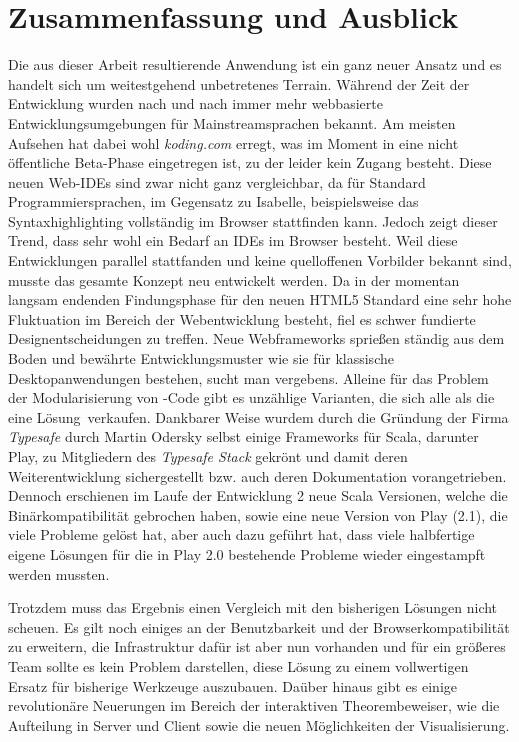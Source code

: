 \chapter{Zusammenfassung und Ausblick}

Die aus dieser Arbeit resultierende Anwendung ist ein ganz neuer Ansatz und es handelt sich um
weitestgehend unbetretenes Terrain. Während der Zeit der Entwicklung wurden nach und nach immer mehr
webbasierte Entwicklungsumgebungen für Mainstreamsprachen bekannt. Am meisten Aufsehen hat dabei
wohl \textit{koding.com} erregt, was im Moment in eine nicht öffentliche Beta-Phase eingetregen ist,
zu der leider kein Zugang besteht. Diese neuen Web-IDEs sind zwar nicht ganz vergleichbar, da für
Standard Programmiersprachen, im Gegensatz zu Isabelle, beispielsweise das Syntaxhighlighting
vollständig im Browser stattfinden kann. Jedoch zeigt dieser Trend, dass sehr wohl ein Bedarf an
IDEs im Browser besteht. Weil diese Entwicklungen parallel stattfanden und keine quelloffenen
Vorbilder bekannt sind, musste das gesamte Konzept neu entwickelt werden. Da in der momentan
langsam endenden Findungsphase für den neuen HTML5 Standard eine sehr hohe Fluktuation im Bereich
der Webentwicklung besteht, fiel es schwer fundierte Designentscheidungen zu treffen. Neue
Webframeworks sprießen ständig aus dem Boden und bewährte Entwicklungsmuster wie sie für klassische
Desktopanwendungen bestehen, sucht man vergebens. Alleine für das Problem der Modularisierung von
-Code gibt es unzählige Varianten, die sich alle als \glqq die eine Lösung\grqq\ verkaufen.
Dankbarer Weise wurdem durch die Gründung der Firma \textit{Typesafe} durch Martin Odersky selbst
einige Frameworks für Scala, darunter Play, zu Mitgliedern des \textit{Typesafe Stack} gekrönt und
damit deren Weiterentwicklung sichergestellt bzw. auch deren Dokumentation vorangetrieben. Dennoch
erschienen im Laufe der Entwicklung 2 neue Scala Versionen, welche die Binärkompatibilität gebrochen
haben, sowie eine neue Version von Play (2.1), die viele Probleme gelöst hat, aber auch dazu geführt
hat, dass viele halbfertige eigene Lösungen für die in Play 2.0 bestehende Probleme wieder
eingestampft werden mussten.

Trotzdem muss das Ergebnis einen Vergleich mit den bisherigen Lösungen nicht scheuen. Es gilt noch
einiges an der Benutzbarkeit und der Browserkompatibilität zu erweitern, die Infrastruktur dafür ist
aber nun vorhanden und für ein größeres Team sollte es kein Problem darstellen, diese Lösung zu
einem vollwertigen Ersatz für bisherige Werkzeuge auszubauen. Daüber hinaus gibt es einige
revolutionäre Neuerungen im Bereich der interaktiven Theorembeweiser, wie die Aufteilung in Server
und Client sowie die neuen Möglichkeiten der Visualisierung.

